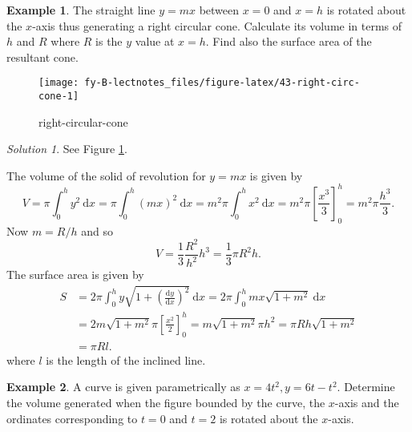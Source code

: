 \documentclass[
  english,
  11pt,
  oneside]{book}
\newcommand{\slide}{}
\theoremstyle{definition}
\theoremstyle{definition}
\newtheorem{example}{Example}[chapter]
\theoremstyle{definition}
\theoremstyle{definition}
\theoremstyle{remark}
\newtheorem*{solution}{Solution}
\begin{document}
\begin{example}
\leavevmode

The straight line \(y=mx\) between \(x=0\) and \(x=h\) is rotated about the \(x\)-axis thus generating a right circular cone. Calculate its volume in terms of \(h\) and \(R\) where \(R\) is the \(y\) value at \(x=h\). Find also the surface area of the resultant cone.

\begin{figure}

{\centering \texttt{[image: fy-B-lectnotes\_files/figure-latex/43-right-circ-cone-1]} 

}

\caption{right-circular-cone}\label{fig:43-right-circ-cone}
\end{figure}

\end{example}

\begin{solution}
See Figure \ref{fig:43-right-circ-cone}.

The volume of the solid of revolution for \(y = mx\) is given by
\[
V = \pi\int_0^hy^2\ \mathrm{d}x = \pi\int_0^h (mx)^2\ \mathrm{d}x = m^2\pi\int_0^hx^2\ \mathrm{d}x = m^2\pi\left[\frac{x^3}3\right]_0^h = m^2\pi\frac{h^3}3.
\]
Now \(m = R/h\) and so
\[
V = \frac13\frac{R^2}{h^2}h^3 = \frac13\pi R^2h.
\]
The surface area is given by
\begin{align*}
S&= 2\pi\int_0^hy\sqrt{1+\left(\frac{\mathrm{d}y}{\mathrm{d}x}\right)^2}\ \mathrm{d}x = 2\pi\int_0^h mx\sqrt{1+m^2}\ \mathrm{d}x\\
&= 2m\sqrt{1+m^2}\pi\left[\frac{x^2}2\right]_0^h = m\sqrt{1+m^2}\pi h^2 = \pi R h\sqrt{1+m^2}\\
&= \pi Rl.
\end{align*}
where \(l\) is the length of the inclined line.
\end{solution}

\begin{slidesonly}

\slide

\hbox{}
\slide

\end{slidesonly}

\begin{example}
A curve is given parametrically as \(x=4t^2, y = 6t-t^2\). Determine the volume generated when the figure bounded by the curve, the \(x\)-axis and the ordinates corresponding to \(t=0\) and \(t=2\) is rotated about the \(x\)-axis.
\end{example}
\end{document}
